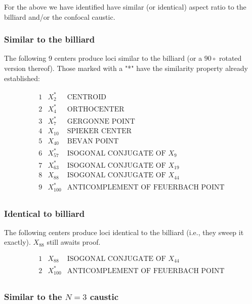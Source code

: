 \documentclass[]{article}
\begin{document}
For the above we have identified have similar (or identical) aspect ratio to the billiard and/or the confocal caustic.

\hypertarget{similar-to-the-billiard}{%
\subsubsection{Similar to the billiard}\label{similar-to-the-billiard}}

The following 9 centers produce loci similar to the billiard (or a \(90\circ\) rotated version thereof). Those marked with a "*" have the similarity property already established:

\[
\begin{array}{cll}
 1 & X_{2}^* & \text{CENTROID} \\
 2 & X_{4}^* & \text{ORTHOCENTER} \\
 3 & X_{7}^* & \text{GERGONNE POINT} \\
 4 & X_{10} & \text{SPIEKER CENTER} \\
 5 & X_{40} & \text{BEVAN POINT} \\
 6 & X_{57}^* & \text{ISOGONAL CONJUGATE OF $X_{9}$} \\
 7 & X_{63}^* & \text{ISOGONAL CONJUGATE OF $X_{19}$} \\
 8 & X_{88} & \text{ISOGONAL CONJUGATE OF $X_{44}$} \\
 9 & X_{100}^* & \text{ANTICOMPLEMENT OF FEUERBACH POINT} \\
\end{array}
\]

\hypertarget{identical-to-billiard}{%
\subsubsection{Identical to billiard}\label{identical-to-billiard}}

The following centers produce loci identical to the billiard (i.e., they sweep it exactly). \(X_{88}\) still awaits proof.

\[
\begin{array}{cll}
 1 & X_{88} & \text{ISOGONAL CONJUGATE OF $X_{44}$} \\
 2 & X_{100}^* & \text{ANTICOMPLEMENT OF FEUERBACH POINT} \\
\end{array}
\]

\hypertarget{similar-to-the-n3-caustic}{%
\subsubsection{\texorpdfstring{Similar to the \(N=3\) caustic}{Similar to the N=3 caustic}}\label{similar-to-the-n3-caustic}}
\end{document}

